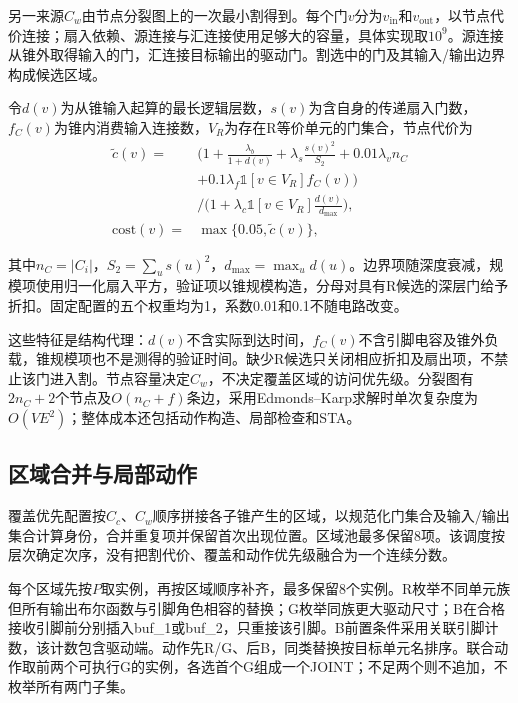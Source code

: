 \documentclass[twocolumn,10pt,fontset=windows]{ctexart}
\begin{document}
另一来源$C_w$由节点分裂图上的一次最小割得到。每个门$v$分为$v_{\mathrm{in}}$和$v_{\mathrm{out}}$，以节点代价连接；扇入依赖、源连接与汇连接使用足够大的容量，具体实现取$10^9$。源连接从锥外取得输入的门，汇连接目标输出的驱动门。割选中的门及其输入/输出边界构成候选区域。

令$d(v)$为从锥输入起算的最长逻辑层数，$s(v)$为含自身的传递扇入门数，$f_C(v)$为锥内消费输入连接数，$V_R$为存在R等价单元的门集合，节点代价为
{\small
\begin{equation}\label{eq:cost}
\begin{aligned}
\widetilde c(v)={}&\Big(1+\frac{\lambda_b}{1+d(v)}
+\lambda_s\frac{s(v)^2}{S_2}+0.01\lambda_v n_C\\
&+0.1\lambda_f\mathbb{1}[v\in V_R]f_C(v)\Big)\\
&\Big/\Big(1+\lambda_c\mathbb{1}[v\in V_R]\frac{d(v)}{d_{\max}}\Big),\\
\mathrm{cost}(v)={}&\max\{0.05,\widetilde c(v)\},
\end{aligned}
\end{equation}
}

其中$n_C=|C_i|$，$S_2=\sum_u s(u)^2$，$d_{\max}=\max_u d(u)$。边界项随深度衰减，规模项使用归一化扇入平方，验证项以锥规模构造，分母对具有R候选的深层门给予折扣。固定配置的五个权重均为1，系数0.01和0.1不随电路改变。

这些特征是结构代理：$d(v)$不含实际到达时间，$f_C(v)$不含引脚电容及锥外负载，锥规模项也不是测得的验证时间。缺少R候选只关闭相应折扣及扇出项，不禁止该门进入割。节点容量决定$C_w$，不决定覆盖区域的访问优先级。分裂图有$2n_C+2$个节点及$O(n_C+f)$条边，采用Edmonds--Karp求解时单次复杂度为$O(VE^2)$；整体成本还包括动作构造、局部检查和STA。

\subsection{区域合并与局部动作}\label{sec:schedule}

覆盖优先配置按$C_c$、$C_w$顺序拼接各子锥产生的区域，以规范化门集合及输入/输出集合计算身份，合并重复项并保留首次出现位置。区域池最多保留8项。该调度按层次确定次序，没有把割代价、覆盖和动作优先级融合为一个连续分数。

每个区域先按$P$取实例，再按区域顺序补齐，最多保留8个实例。R枚举不同单元族但所有输出布尔函数与引脚角色相容的替换；G枚举同族更大驱动尺寸；B在合格接收引脚前分别插入buf\_1或buf\_2，只重接该引脚。B前置条件采用关联引脚计数，该计数包含驱动端。动作先R/G、后B，同类替换按目标单元名排序。联合动作取前两个可执行G的实例，各选首个G组成一个JOINT；不足两个则不追加，不枚举所有两门子集。
\end{document}
